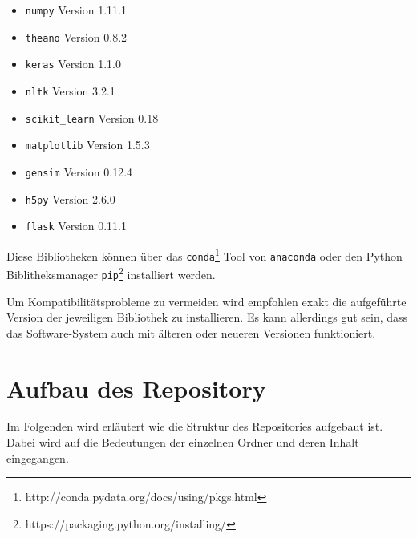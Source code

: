 \begin{appendices}
\begin{itemize}[noitemsep]
  \item \texttt{numpy} Version 1.11.1
  \item \texttt{theano} Version 0.8.2
  \item \texttt{keras} Version 1.1.0
  \item \texttt{nltk} Version 3.2.1
  \item \texttt{scikit{\_}learn} Version 0.18
  \item \texttt{matplotlib} Version 1.5.3
  \item \texttt{gensim} Version 0.12.4
  \item \texttt{h5py} Version 2.6.0
  \item \texttt{flask} Version 0.11.1
\end{itemize}

Diese Bibliotheken können über das \texttt{conda}\footnote{http://conda.pydata.org/docs/using/pkgs.html} Tool von \texttt{anaconda} oder den Python Biblitheksmanager \texttt{pip}\footnote{https://packaging.python.org/installing/} installiert werden.

Um Kompatibilitätsprobleme zu vermeiden wird empfohlen exakt die aufgeführte Version der jeweiligen Bibliothek zu installieren. Es kann allerdings gut sein, dass das Software-System auch mit älteren oder neueren Versionen funktioniert.

\section{Aufbau des Repository}
Im Folgenden wird erläutert wie die Struktur des Repositories aufgebaut ist. Dabei wird auf die Bedeutungen der einzelnen Ordner und deren Inhalt eingegangen.


\end{appendices}
